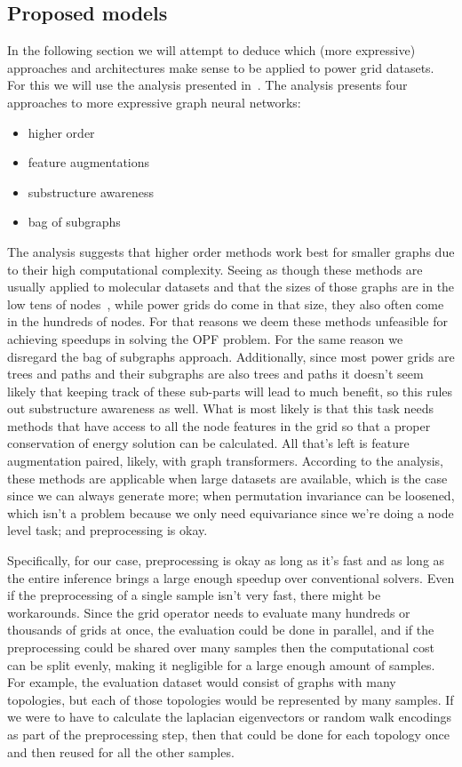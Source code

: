 \subsection*{Proposed models}
In the following section we will attempt to deduce which (more expressive) approaches and architectures
make sense to be applied to power grid datasets.
For this we will use the analysis presented in~\cite{expresive2022tutorial}.
The analysis presents four approaches to more expressive graph neural networks:
\begin{itemize}
    \item higher order
    \item feature augmentations
    \item substructure awareness
    \item bag of subgraphs
\end{itemize}

The analysis suggests that higher order methods work best for smaller graphs due to their
high computational complexity.
Seeing as though these methods are usually applied to molecular datasets and that the
sizes of those graphs are in the low tens of nodes~\cite{morris2020tudataset},
while power grids do come in that size, they also often come in the hundreds of nodes.
For that reasons we deem these methods unfeasible for achieving speedups in solving the OPF problem.
For the same reason we disregard the bag of subgraphs approach.
Additionally, since most power grids are trees and paths and their subgraphs are also trees and paths
it doesn't seem likely that keeping track of these sub-parts will lead to much benefit, so this
rules out substructure awareness as well.
What is most likely is that this task needs methods that have access to all the node features in the
grid so that a proper conservation of energy solution can be calculated.
All that's left is feature augmentation paired, likely, with graph transformers.
According to the analysis, these methods are applicable when large datasets are available,
which is the case since we can always generate more; when permutation invariance can be loosened,
which isn't a problem because we only need equivariance since we're doing a node level task; and
preprocessing is okay.

Specifically, for our case, preprocessing is okay as long as it's fast and as long as the
entire inference brings a large enough speedup over conventional solvers.
Even if the preprocessing of a single sample isn't very fast, there might be workarounds.
Since the grid operator needs to evaluate many hundreds or thousands of grids at once, the
evaluation could be done in parallel, and if the preprocessing could be shared over many
samples then the computational cost can be split evenly, making it negligible for a large
enough amount of samples.
For example, the evaluation dataset would consist of graphs with many topologies, but each
of those topologies would be represented by many samples.
If we were to have to calculate the laplacian eigenvectors or random walk encodings as part
of the preprocessing step, then that could be done for each topology once and then reused
for all the other samples.

